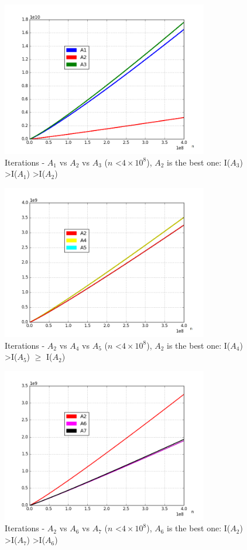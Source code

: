 \documentclass[10pt,twocolumn]{article}
\begin{document}
\begin{figure}[!ht]
\centering
\includegraphics[width=9cm]{f_checkpoint_iters_alg}
\caption{Iterations - $A_1$ vs $A_2$ vs $A_3$ ($n$ \textless $4  \times 10^8$), $A_2$ is the best one: I($A_3$) \textgreater I($A_1$) \textgreater I($A_2$)}
\label{fig:alg_iterations}
\end{figure}

\begin{figure}[!ht]
\centering
\includegraphics[width=9cm]{f_checkpoint_iters_alg_second}
\caption{Iterations - $A_2$ vs $A_4$ vs $A_5$ ($n$ \textless $4  \times 10^8$), $A_2$ is the best one: I($A_4$) \textgreater I($A_5$) $\geq$ I($A_2$)}
\label{fig:alg_iterations_second}
\end{figure}

\begin{figure}[!ht]
\centering
\includegraphics[width=9cm]{f_checkpoint_iters_alg_third}
\caption{Iterations - $A_2$ vs $A_6$ vs $A_7$ ($n$ \textless $4  \times 10^8$), $A_6$ is the best one: I($A_2$) \textgreater I($A_7$) \textgreater I($A_6$)}
\label{fig:alg_iterations_third}
\end{figure}
\end{document}
